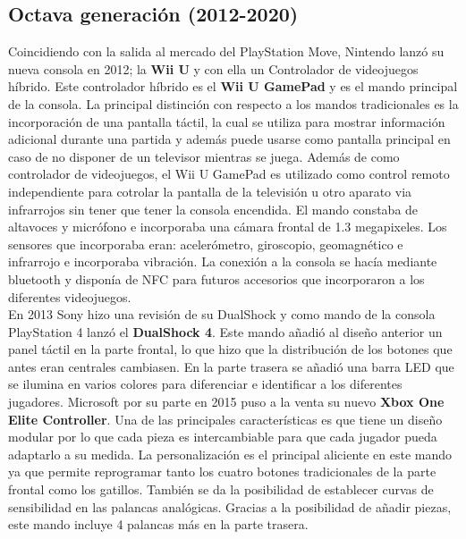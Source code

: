 \subsection{Octava generaci\'on (2012-2020)}

Coincidiendo con la salida al mercado del PlayStation Move, Nintendo lanz\'o su nueva consola en 2012; la \textbf{Wii U} y con ella un Controlador de videojuegos h\'ibrido. Este controlador h\'ibrido es el \textbf{Wii U GamePad} y es el mando principal de la consola. La principal distinci\'on con respecto a los mandos tradicionales es la incorporaci\'on de una pantalla t\'actil, la cual se utiliza para mostrar informaci\'on adicional durante una partida y adem\'as puede usarse como pantalla principal en caso de no disponer de un televisor mientras se juega. Adem\'as de como controlador de videojuegos, el Wii U GamePad es utilizado como control remoto independiente para cotrolar la pantalla de la televisi\'on u otro aparato via infrarrojos sin tener que tener la consola encendida. El mando constaba de altavoces y micr\'ofono e incorporaba una c\'amara frontal de 1.3 megapixeles. Los sensores que incorporaba eran: aceler\'ometro, giroscopio, geomagn\'etico e infrarrojo e incorporaba vibraci\'on. La conexi\'on a la consola se hac\'ia mediante bluetooth  y dispon\'ia de NFC para futuros accesorios que incorporaron a los diferentes videojuegos.\\

En 2013 Sony hizo una revisi\'on de su DualShock y como mando de la consola PlayStation 4 lanz\'o el \textbf{DualShock 4}. Este mando a\~nadi\'o al dise\~no anterior un panel t\'actil en la parte frontal, lo que hizo que la distribuci\'on de los botones que antes eran centrales cambiasen. En la parte trasera se a\~nadi\'o una barra LED que se ilumina en varios colores para diferenciar e identificar a los diferentes jugadores. Microsoft por su parte en 2015 puso a la venta su nuevo \textbf{Xbox One Elite Controller}. Una de las principales caracter\'isticas es que tiene un dise\~no modular por lo que cada pieza es intercambiable para que cada jugador pueda adaptarlo a su medida. La personalizaci\'on es el principal aliciente en este mando ya que permite reprogramar tanto los cuatro botones tradicionales de la parte frontal como los gatillos. Tambi\'en se da la posibilidad de establecer curvas de sensibilidad en las palancas anal\'ogicas. Gracias a la posibilidad de a\~nadir piezas, este mando incluye 4 palancas m\'as en la parte trasera.\\

